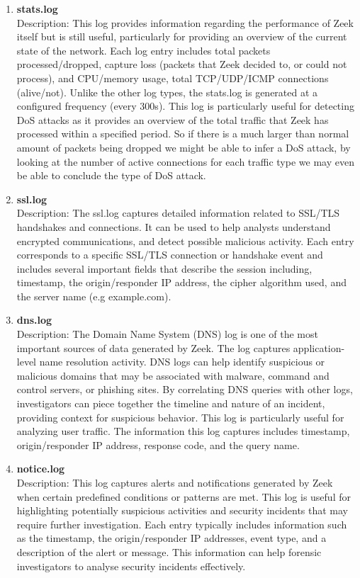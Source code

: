 \documentclass[final,1p,times,authoryear]{elsarticle}
\begin{document}
\begin{enumerate}[label=(\alph*)]
    \item \textbf{stats.log} \\
    Description: This log provides information regarding the performance of Zeek itself but is still useful, particularly for providing an overview of the current state of the network. Each log entry includes total packets processed/dropped, capture loss (packets that Zeek decided to, or could not process), and CPU/memory usage, total TCP/UDP/ICMP connections (alive/not). Unlike the other log types, the stats.log is generated at a configured frequency (every 300s). This log is particularly useful for detecting DoS attacks as it provides an overview of the total traffic that Zeek has processed within a specified period. So if there is a much larger than normal amount of packets being dropped we might be able to infer a DoS attack, by looking at the number of active connections for each traffic type we may even be able to conclude the type of DoS attack.
    
    \item \textbf{ssl.log} \\
    Description: The ssl.log captures detailed information related to SSL/TLS handshakes and connections. It can be used to help analysts understand encrypted communications, and detect possible malicious activity. Each entry corresponds to a specific SSL/TLS connection or handshake event and includes several important fields that describe the session including, timestamp, the origin/responder IP address, the cipher algorithm used, and the server name (e.g example.com).
    
    \item \textbf{dns.log} \\
    Description: The Domain Name System (DNS) log is one of the most important sources of data generated by Zeek. The log captures application-level name resolution activity. DNS logs can help identify suspicious or malicious domains that may be associated with malware, command and control servers, or phishing sites. By correlating DNS queries with other logs, investigators can piece together the timeline and nature of an incident, providing context for suspicious behavior. This log is particularly useful for analyzing user traffic. The information this log captures includes timestamp, origin/responder IP address, response code, and the query name.
    
    \item \textbf{notice.log} \\
    Description: This log captures alerts and notifications generated by Zeek when certain predefined conditions or patterns are met. This log is useful for highlighting potentially suspicious activities and security incidents that may require further investigation. Each entry typically includes information such as the timestamp, the origin/responder IP addresses, event type, and a description of the alert or message. This information can help forensic investigators to analyse security incidents effectively.
    

\end{enumerate}
\end{document}
